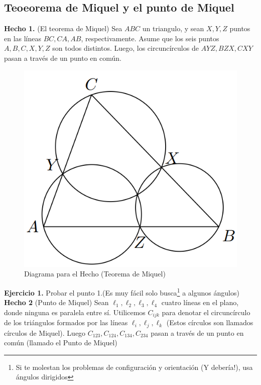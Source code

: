 \documentclass[11pt, a4paper]{article}
\begin{document}
\begin{enumerate}
\section{Teoeorema de Miquel y el punto de Miquel}
\textbf{Hecho 1.} (El teorema de Miquel) Sea $ABC$ un triangulo, y sean $X, Y, Z$ puntos en las l\'ineas $BC, CA, AB$, respectivamente. Asume que los seis puntos $A, B, C, X, Y, Z$ son todos distintos. Luego, los circunc\'irculos de $AYZ, BZX, CXY$ pasan a trav\'es de un punto en com\'un.
\begin{figure}[h]
	\centering
	\includegraphics[scale=0.3]{p3.1}
	\caption{Diagrama para el Hecho (Teorema de Miquel)}
\end{figure}
\end{enumerate}
\textbf{Ejercicio 1.} Probar el punto 1.(Es muy f\'acil solo busca\footnote{Si te molestan los problemas de configuraci\'on y orientaci\'on (Y deber\'ia!), usa \'angulos dirigidos} a algunos \'angulos)\\

\textbf{Hecho 2} (Punto de Miquel) Sean $\ell_1, \ell_2, \ell_3, \ell_4$ cuatro l\'ineas en el plano, donde ninguna es paralela entre s\'i. Utilicemos $C_{ijk}$ para denotar el circunc\'irculo de los tri\'angulos formados por las l\'ineas $\ell_i, \ell_j, \ell_k$ (Estos c\'irculos son llamados c\'irculos de Miquel). Luego $C_{123}, C_{124}, C_{134}, C_{234}$ pasan a trav\'es de un punto en com\'un (llamado el Punto de Miquel)\\
\end{document}
